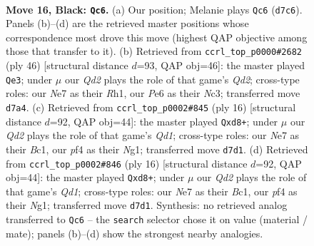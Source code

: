 \documentclass[11pt]{article}
\begin{document}
\clearpage

\begin{figure}[p]\centering
\begin{subfigure}{0.46\textwidth}\centering
\resizebox{\linewidth}{!}{%
\newchessgame
\chessboard[
  setfen={rnb1r3/1p1qnpkp/4p3/p1P1P1P1/2B2P2/P7/2P5/R1BQK1NR b KQ - 0 16},
  showmover=false,
  pgfstyle=straightmove, color=movearrow, markmove={d7-c6}
]}
\caption{}
\end{subfigure}\hfill
\begin{subfigure}{0.46\textwidth}\centering
\resizebox{\linewidth}{!}{%
\newchessgame
\chessboard[
  setfen={r3k2r/pp1qb1pb/2p4p/7P/PP4P1/2N2P2/3Q2K1/R1B4R w - - 0 24},
  showmover=false,
  pgfstyle=straightmove, color=movearrow, markmove={d2-e3}
]}
\caption{}
\end{subfigure}
\\[4pt]
\begin{subfigure}{0.46\textwidth}\centering
\resizebox{\linewidth}{!}{%
\newchessgame
\chessboard[
  setfen={r1bqk1nr/p1p3bp/2p3p1/4pp2/2P5/2N1P1P1/PP3P1P/R1BQK1NR w KQkq - 0 9},
  showmover=false,
  pgfstyle=straightmove, color=movearrow, markmove={d1-d8}
]}
\caption{}
\end{subfigure}\hfill
\begin{subfigure}{0.46\textwidth}\centering
\resizebox{\linewidth}{!}{%
\newchessgame
\chessboard[
  setfen={r1bqk1nr/p1p3bp/2p3p1/4pp2/2P5/2N1P1P1/PP3P1P/R1BQK1NR w KQkq - 0 9},
  showmover=false,
  pgfstyle=straightmove, color=movearrow, markmove={d1-d8}
]}
\caption{}
\end{subfigure}
\caption{\textbf{Move 16, Black: \texttt{Qc6}.} (a) Our position; Melanie plays \texttt{Qc6} (\texttt{d7c6}). Panels (b)--(d) are the retrieved master positions whose correspondence most drove this move (highest QAP objective among those that transfer to it). (b) Retrieved from \texttt{ccrl\_top\_p0000\#2682} (ply 46) [structural distance $d$=93, QAP obj=46]: the master played \texttt{Qe3}; under $\mu$ our \emph{Qd2} plays the role of that game's \emph{Qd2}; cross-type roles: our \emph{N}e7 as their \emph{R}h1, our \emph{P}e6 as their \emph{N}c3; transferred move \texttt{d7a4}. (c) Retrieved from \texttt{ccrl\_top\_p0002\#845} (ply 16) [structural distance $d$=92, QAP obj=44]: the master played \texttt{Qxd8+}; under $\mu$ our \emph{Qd2} plays the role of that game's \emph{Qd1}; cross-type roles: our \emph{N}e7 as their \emph{B}c1, our \emph{p}f4 as their \emph{N}g1; transferred move \texttt{d7d1}. (d) Retrieved from \texttt{ccrl\_top\_p0002\#846} (ply 16) [structural distance $d$=92, QAP obj=44]: the master played \texttt{Qxd8+}; under $\mu$ our \emph{Qd2} plays the role of that game's \emph{Qd1}; cross-type roles: our \emph{N}e7 as their \emph{B}c1, our \emph{p}f4 as their \emph{N}g1; transferred move \texttt{d7d1}. Synthesis: no retrieved analog transferred to \texttt{Qc6} -- the \texttt{search} selector chose it on value (material / mate); panels (b)--(d) show the strongest nearby analogies.}
\label{fig:thought-m31}
\end{figure}
\end{document}
